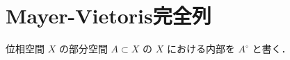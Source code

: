 \documentclass[algtopo_main]{subfiles}
\begin{document}



\section{Mayer-Vietoris完全列}

位相空間 $X$ の部分空間 $A \subset X$ の $X$ における内部を $A^\circ$ と書く．
\end{document}

